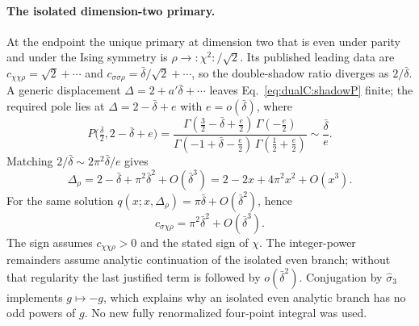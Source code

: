 \documentclass[11pt,a4paper]{article}
\numberwithin{equation}{section}
\newcommand{\db}{\bar\delta}
\begin{document}
\paragraph{The isolated dimension-two primary.} At the endpoint the unique primary at dimension two that is even under
parity and under the Ising symmetry is $\rho\to{:}\chi^2{:}/\sqrt2$. Its published leading data are
$c_{\chi\chi\rho}=\sqrt2+\cdots$ and $c_{\sigma\sigma\rho}=\db/\sqrt2+\cdots$, so the double-shadow ratio diverges as
$2/\db$. A generic displacement $\Delta=2+a'\db+\cdots$ leaves Eq.~\eqref{eq:dualC:shadowP} finite; the required pole
lies at $\Delta=2-\db+e$ with $e=o(\db)$, where
\begin{equation}
 P\bigl(\tfrac{\db}{2},2-\db+e\bigr)=\frac{\Gamma(\frac32-\db+\frac e2)\,\Gamma(-\frac e2)}
 {\Gamma(-1+\db-\frac e2)\,\Gamma(\frac12+\frac e2)}\sim\frac{\db}{e} .
\end{equation}
Matching $2/\db\sim2\pi^2\db/e$ gives
\begin{equation}
 \Delta_\rho=2-\db+\pi^2\db^2+O(\db^3)=2-2x+4\pi^2x^2+O(x^3).
\end{equation}
For the same solution $q(x;x,\Delta_\rho)=\pi\db+O(\db^2)$, hence
\begin{equation}
 c_{\sigma\chi\rho}=\pi^2\db^2+O(\db^3).
\end{equation}
The sign assumes $c_{\chi\chi\rho}>0$ and the stated sign of $\chi$. The integer-power remainders assume analytic
continuation of the isolated even branch; without that regularity the last justified term is followed by $o(\db^2)$.
Conjugation by $\hat\sigma_3$ implements $g\mapsto-g$, which explains why an isolated even analytic branch has no odd
powers of $g$. No new fully renormalized four-point integral was used.
\end{document}

